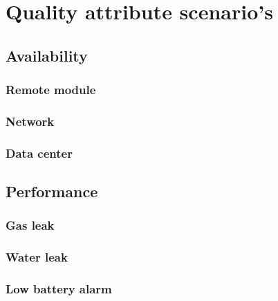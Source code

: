 \chapter{Quality attribute scenario's}
\label{quality-attribute-scenarios}

\section{Availability}

\subsection{Remote module}
\label{qas-av-module}


\subsection{Network}
\label{qas-av-network}


\subsection{Data center}
\label{qas-av-datacenter}


\section{Performance}

\subsection{Gas leak}
\label{qas-perf-gas}


\subsection{Water leak}
\label{qas-perf-water}


\subsection{Low battery alarm}
\label{qas-perf-low-battery}

